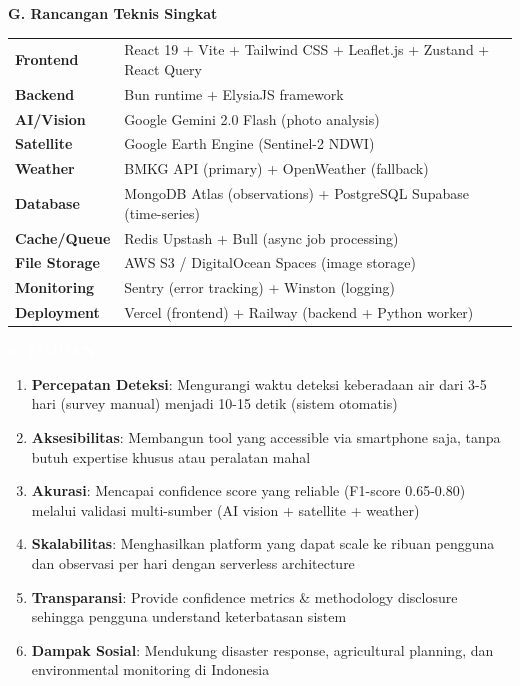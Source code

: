 \documentclass[12pt,a4paper]{article}
\newcommand{\sectionbox}[1]{%
  \colorbox{samsungblue}{%
    \parbox{\textwidth}{%
      \textcolor{white}{\large\bfseries #1}%
    }%
  }%
}
\newcommand{\subsectionbox}[1]{%
  \textbf{\large #1}\\[0.3cm]
}
\begin{document}
\subsectionbox{G. Rancangan Teknis Singkat}

\begin{tabularx}{\textwidth}{|l|X|}
  \hline
  \textbf{Frontend} & React 19 + Vite + Tailwind CSS + Leaflet.js + Zustand + React Query \\[0.2cm]
  \textbf{Backend} & Bun runtime + ElysiaJS framework \\[0.2cm]
  \textbf{AI/Vision} & Google Gemini 2.0 Flash (photo analysis) \\[0.2cm]
  \textbf{Satellite} & Google Earth Engine (Sentinel-2 NDWI) \\[0.2cm]
  \textbf{Weather} & BMKG API (primary) + OpenWeather (fallback) \\[0.2cm]
  \textbf{Database} & MongoDB Atlas (observations) + PostgreSQL Supabase (time-series) \\[0.2cm]
  \textbf{Cache/Queue} & Redis Upstash + Bull (async job processing) \\[0.2cm]
  \textbf{File Storage} & AWS S3 / DigitalOcean Spaces (image storage) \\[0.2cm]
  \textbf{Monitoring} & Sentry (error tracking) + Winston (logging) \\[0.2cm]
  \textbf{Deployment} & Vercel (frontend) + Railway (backend + Python worker) \\
  \hline
\end{tabularx}

\vspace{1cm}

\sectionbox{6. TUJUAN}

\vspace{0.5cm}

\begin{enumerate}
  \item \textbf{Percepatan Deteksi}: Mengurangi waktu deteksi keberadaan air dari 3-5 hari (survey manual) menjadi 10-15 detik (sistem otomatis)

  \item \textbf{Aksesibilitas}: Membangun tool yang accessible via smartphone saja, tanpa butuh expertise khusus atau peralatan mahal

  \item \textbf{Akurasi}: Mencapai confidence score yang reliable (F1-score 0.65-0.80) melalui validasi multi-sumber (AI vision + satellite + weather)

  \item \textbf{Skalabilitas}: Menghasilkan platform yang dapat scale ke ribuan pengguna dan observasi per hari dengan serverless architecture

  \item \textbf{Transparansi}: Provide confidence metrics \& methodology disclosure sehingga pengguna understand keterbatasan sistem

  \item \textbf{Dampak Sosial}: Mendukung disaster response, agricultural planning, dan environmental monitoring di Indonesia
\end{enumerate}
\end{document}
